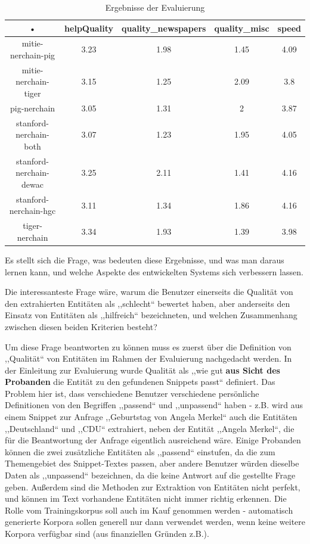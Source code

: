 \begin{table}
\begin{tabular}{|c|c|c|c|c|}
\hline 
• & helpQuality & quality\_newspapers & quality\_misc & speed \\ 
\hline 
mitie-nerchain-pig & 3.23 & 1.98 & 1.45 & 4.09 \\ 
\hline 
mitie-nerchain-tiger & 3.15 & 1.25 & 2.09 & 3.8 \\ 
\hline 
pig-nerchain & 3.05 & 1.31 & 2 & 3.87 \\ 
\hline 
stanford-nerchain-both & 3.07 & 1.23 & 1.95 & 4.05 \\ 
\hline 
stanford-nerchain-dewac & 3.25 & 2.11 & 1.41 & 4.16 \\ 
\hline 
stanford-nerchain-hgc & 3.11 & 1.34 & 1.86 & 4.16 \\ 
\hline 
tiger-nerchain & 3.34 & 1.93 & 1.39 & 3.98 \\ 
\hline 
\end{tabular} 
\caption{Ergebnisse der Evaluierung}
\label{app:RESULTS}
\end{table}


Es stellt sich die Frage, was bedeuten diese Ergebnisse, und was man daraus lernen kann, und welche Aspekte des entwickelten Systems sich verbessern lassen.

Die interessanteste Frage wäre, warum die Benutzer einerseits die Qualität von den extrahierten Entitäten als ,,schlecht`` bewertet haben, aber anderseits den Einsatz von Entitäten als ,,hilfreich`` bezeichneten, und welchen Zusammenhang zwischen diesen beiden Kriterien besteht? 

Um diese Frage beantworten zu können muss es zuerst über die Definition von ,,Qualität`` von Entitäten im Rahmen der Evaluierung nachgedacht werden. In der Einleitung zur Evaluierung wurde Qualität als ,,wie gut \textbf{aus Sicht des Probanden} die Entität zu den gefundenen Snippets passt`` definiert. Das Problem hier ist, dass verschiedene Benutzer verschiedene persönliche Definitionen von den Begriffen ,,passend`` und ,,unpassend`` haben - z.B. wird aus einem Snippet zur Anfrage ,,Geburtstag von Angela Merkel`` auch die Entitäten ,,Deutschland`` und ,,CDU`` extrahiert, neben der Entität ,,Angela Merkel``, die für die Beantwortung der Anfrage eigentlich ausreichend wäre. Einige Probanden können die zwei zusätzliche Entitäten als ,,passend`` einstufen, da die zum Themengebiet des Snippet-Textes passen, aber andere Benutzer würden dieselbe Daten als ,,unpassend`` bezeichnen, da die keine Antwort auf die gestellte Frage geben. Außerdem sind die Methoden zur Extraktion von Entitäten nicht perfekt, und können im Text vorhandene Entitäten nicht immer richtig erkennen. Die Rolle vom Trainingskorpus soll auch im Kauf genommen werden - automatisch generierte Korpora sollen generell nur dann verwendet werden, wenn keine weitere Korpora verfügbar sind (aus finanziellen Gründen z.B.).

